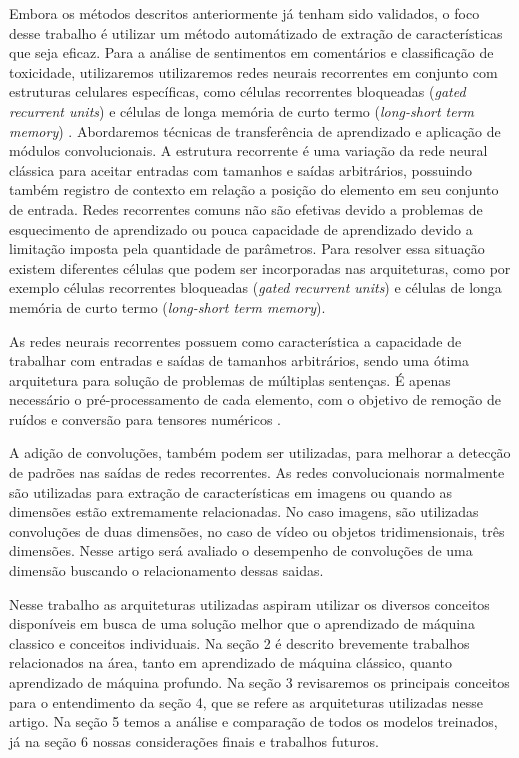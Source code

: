 \documentclass[12pt]{article}
\begin{document}
Embora os métodos descritos anteriormente já tenham sido validados, o foco desse trabalho é utilizar um método automátizado de extração de características que seja eficaz. Para a análise de sentimentos em comentários e classificação de toxicidade, utilizaremos utilizaremos redes neurais recorrentes em conjunto com estruturas celulares específicas, como células recorrentes bloqueadas (\textit{gated recurrent units}) \cite{DBLP:journals/corr/PascanuGCB13} e células de longa memória de curto termo (\textit{long-short term memory}) \cite{sep:97}. Abordaremos técnicas de transferência de aprendizado e aplicação de módulos convolucionais.
A estrutura recorrente é uma variação da rede neural clássica para aceitar entradas com tamanhos e saídas arbitrários, possuindo também registro de contexto em relação a posição do elemento em seu conjunto de entrada. Redes recorrentes comuns não são efetivas devido a problemas de esquecimento de aprendizado ou pouca capacidade de aprendizado devido a limitação imposta pela quantidade de parâmetros. Para resolver essa situação existem diferentes células que podem ser incorporadas nas arquiteturas, como por exemplo células recorrentes bloqueadas (\textit{gated recurrent units}) e células de longa memória de curto termo (\textit{long-short term memory}).

As redes neurais recorrentes possuem como característica a capacidade de trabalhar com entradas e saídas de tamanhos arbitrários, sendo uma ótima arquitetura para solução de problemas de múltiplas sentenças. É apenas necessário o pré-processamento de cada elemento, com o objetivo de remoção de ruídos e conversão para tensores numéricos \cite{karpathy:2015}.

A adição de convoluções, também podem ser utilizadas, para melhorar a detecção de padrões nas saídas de redes recorrentes. As redes convolucionais normalmente são utilizadas para extração de características em imagens \cite{lecun:98} ou quando as dimensões estão extremamente relacionadas. No caso imagens, são utilizadas convoluções de duas dimensões, no caso de vídeo ou objetos tridimensionais, três dimensões. Nesse artigo será avaliado o desempenho de convoluções de uma dimensão buscando o relacionamento dessas saidas.

Nesse trabalho as arquiteturas utilizadas aspiram utilizar os diversos conceitos disponíveis em busca de uma solução melhor que o aprendizado de máquina classico e conceitos individuais. Na seção 2 é descrito brevemente trabalhos relacionados na área, tanto em aprendizado de máquina clássico, quanto aprendizado de máquina profundo. Na seção 3 revisaremos os principais conceitos para o entendimento da seção 4, que se refere as arquiteturas utilizadas nesse artigo. Na seção 5 temos a análise e comparação de todos os modelos treinados, já na seção 6 nossas considerações finais e trabalhos futuros.
\end{document}
